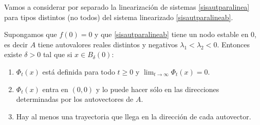 Vamos a considerar por separado la linearización de sistemas
\eqref{sisautparalinea} para  tipos distintos (no todos) del
sistema linearizado \eqref{sisautparalineab}.

\begin{teorema}{} Supongamos que $f(0)=0$ y que
\eqref{sisautparalineab} tiene un nodo estable en $0$, es decir
$A$ tiene autovalores reales distintos y negativos
$\lambda_1<\lambda_2<0$. Entonces existe $\delta>0$ tal que si
$x\in B_{\delta}(0)$:
\begin{enumerate}
       \item\label{inc1}  $\Phi_t(x)$ está definida para todo
            $t\geq 0$ y $\lim_{t\to\infty}\Phi_t(x)=0$.
        \item\label{inc2} $\Phi_t(x)$ entra en $(0,0)$ y lo puede hacer sólo en las
                direcciones determinadas por los autovectores de $A$.
        \item\label{inc3}  Hay al menos una trayectoria que llega en la dirección de cada
                autovector.
\end{enumerate}
\end{teorema}

